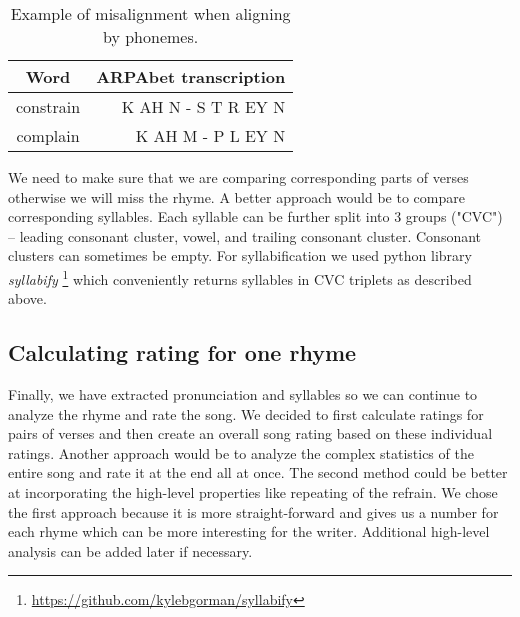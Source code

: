 \begin{table}[h!]
		\centering
	\begin{tabular}{c r} 
		Word & ARPAbet transcription \\ [0.5ex] 
		\hline
		constrain & K AH N - S T R EY N \\ 
		complain & K AH M - \space\space\space P L EY N \\
	\end{tabular}
	\caption{Example of misalignment when aligning by phonemes.}
	\label{phon_misalign_table}
\end{table}

We need to make sure that we are comparing corresponding parts of verses otherwise we will miss the rhyme. A better approach would be to compare corresponding syllables. Each syllable can be further split into 3 groups ("CVC") -- leading consonant cluster, vowel, and trailing consonant cluster. Consonant clusters can sometimes be empty. For syllabification we used python library \textit{syllabify} \footnote{\url{https://github.com/kylebgorman/syllabify}} which conveniently returns syllables in CVC triplets as described above.


\subsection{Calculating rating for one rhyme}
Finally, we have extracted pronunciation and syllables so we can continue to analyze the rhyme and rate the song. We decided to first calculate ratings for pairs of verses and then create an overall song rating based on these individual ratings. Another approach would be to analyze the complex statistics of the entire song and rate it at the end all at once. The second method could be better at incorporating the high-level properties like repeating of the refrain. We chose the first approach because it is more straight-forward and gives us a number for each rhyme which can be more interesting for the writer. Additional high-level analysis can be added later if necessary.

